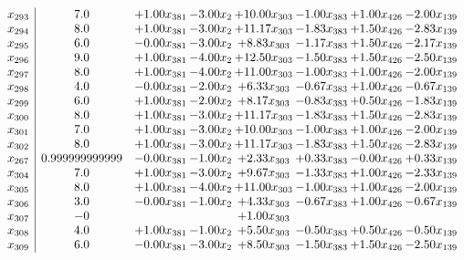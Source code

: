 \documentclass[8pt]{article}
\begin{document}
\[\begin{array}{c| c c@{\hskip 2pt} c@{\hskip 2pt} c@{\hskip 2pt} c@{\hskip 2pt} c@{\hskip 2pt} c@{\hskip 2pt} }
 x_{293}   &  7.0 & +  1.00 x_{381} & -3.00 x_{2} & + 10.00 x_{303} & -1.00 x_{383} & +  1.00 x_{426} & -2.00 x_{139}\\
 x_{294}   &  8.0 & +  1.00 x_{381} & -3.00 x_{2} & + 11.17 x_{303} & -1.83 x_{383} & +  1.50 x_{426} & -2.83 x_{139}\\
 x_{295}   &  6.0 & -0.00 x_{381} & -3.00 x_{2} & +  8.83 x_{303} & -1.17 x_{383} & +  1.50 x_{426} & -2.17 x_{139}\\
 x_{296}   &  9.0 & +  1.00 x_{381} & -4.00 x_{2} & + 12.50 x_{303} & -1.50 x_{383} & +  1.50 x_{426} & -2.50 x_{139}\\
 x_{297}   &  8.0 & +  1.00 x_{381} & -4.00 x_{2} & + 11.00 x_{303} & -1.00 x_{383} & +  1.00 x_{426} & -2.00 x_{139}\\
 x_{298}   &  4.0 & -0.00 x_{381} & -2.00 x_{2} & +  6.33 x_{303} & -0.67 x_{383} & +  1.00 x_{426} & -0.67 x_{139}\\
 x_{299}   &  6.0 & +  1.00 x_{381} & -2.00 x_{2} & +  8.17 x_{303} & -0.83 x_{383} & +  0.50 x_{426} & -1.83 x_{139}\\
 x_{300}   &  8.0 & +  1.00 x_{381} & -3.00 x_{2} & + 11.17 x_{303} & -1.83 x_{383} & +  1.50 x_{426} & -2.83 x_{139}\\
 x_{301}   &  7.0 & +  1.00 x_{381} & -3.00 x_{2} & + 10.00 x_{303} & -1.00 x_{383} & +  1.00 x_{426} & -2.00 x_{139}\\
 x_{302}   &  8.0 & +  1.00 x_{381} & -3.00 x_{2} & + 11.17 x_{303} & -1.83 x_{383} & +  1.50 x_{426} & -2.83 x_{139}\\
 x_{267}   &  0.999999999999 & -0.00 x_{381} & -1.00 x_{2} & +  2.33 x_{303} & +  0.33 x_{383} & -0.00 x_{426} & +  0.33 x_{139}\\
 x_{304}   &  7.0 & +  1.00 x_{381} & -3.00 x_{2} & +  9.67 x_{303} & -1.33 x_{383} & +  1.00 x_{426} & -2.33 x_{139}\\
 x_{305}   &  8.0 & +  1.00 x_{381} & -4.00 x_{2} & + 11.00 x_{303} & -1.00 x_{383} & +  1.00 x_{426} & -2.00 x_{139}\\
 x_{306}   &  3.0 & -0.00 x_{381} & -1.00 x_{2} & +  4.33 x_{303} & -0.67 x_{383} & +  1.00 x_{426} & -0.67 x_{139}\\
 x_{307}   &  -0  &    &   & +  1.00 x_{303} &    &    &   \\
 x_{308}   &  4.0 & +  1.00 x_{381} & -1.00 x_{2} & +  5.50 x_{303} & -0.50 x_{383} & +  0.50 x_{426} & -0.50 x_{139}\\
 x_{309}   &  6.0 & -0.00 x_{381} & -3.00 x_{2} & +  8.50 x_{303} & -1.50 x_{383} & +  1.50 x_{426} & -2.50 x_{139}\\

\end{array}\]
\end{document}
